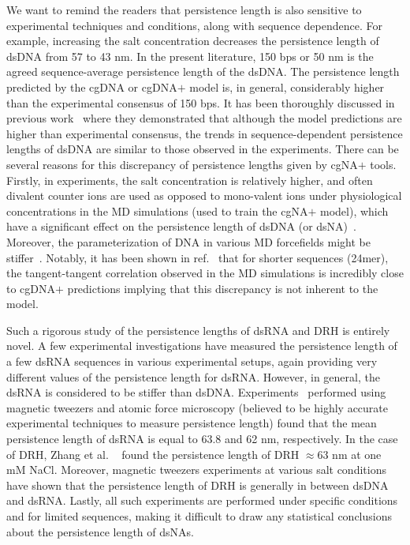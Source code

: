We want to remind the readers that persistence length is also sensitive to experimental techniques and conditions, along with sequence dependence.
For example, increasing the salt concentration decreases the persistence length of dsDNA from 57 to 43 nm. 
In the present literature, 150 bps or 50 nm is the agreed sequence-average persistence length of the dsDNA. 
The persistence length predicted by the cgDNA or cgDNA$+$ model is, in general, considerably higher than the experimental consensus of 150 bps.
It has been thoroughly discussed in previous work~\cite{patelithesis,cgdnamc} where they demonstrated that although the model predictions are higher than experimental consensus, the trends in sequence-dependent persistence lengths of dsDNA are similar to those observed in the experiments.
There can be several reasons for this discrepancy of persistence lengths given by cgNA$+$ tools.
Firstly, in experiments, the salt concentration is relatively higher, and often divalent counter ions are used as opposed to mono-valent ions under physiological concentrations in the MD simulations (used to train the cgNA$+$ model), which have a significant effect on the persistence length of dsDNA (or dsNA)~\cite{savelyev2012monovalent,zhang2019mechanical,brunet2015dependence}.
Moreover, the parameterization of DNA in various MD forcefields might be stiffer~\cite{parmbsc1,dans2017accurate}.  
Notably, it has been shown in ref.~\cite{patelithesis} that for shorter sequences (24mer), the tangent-tangent correlation observed in the MD simulations is incredibly close to cgDNA$+$ predictions implying that this discrepancy is not inherent to the model.

Such a rigorous study of the persistence lengths of dsRNA and DRH is entirely novel.
A few experimental investigations have measured the persistence length of a few dsRNA sequences in various experimental setups, again providing very different values of the persistence length for dsRNA.
However, in general, the dsRNA is considered to be stiffer than dsDNA.
Experiments~\cite{abels2005single} performed using magnetic tweezers and atomic force microscopy (believed to be highly accurate experimental techniques to measure persistence length) found that the mean persistence length of dsRNA is equal to 63.8 and 62 nm, respectively.
In the case of DRH, Zhang et al. ~\cite{zhang2019mechanical} found the persistence length of DRH $\approx 63$ nm at one mM NaCl.
Moreover, magnetic tweezers experiments at various salt conditions have shown that the persistence length of DRH is generally in between dsDNA and dsRNA.
Lastly, all such experiments are performed under specific conditions and for limited sequences, making it difficult to draw any statistical conclusions about the persistence length of dsNAs.\clearpage

